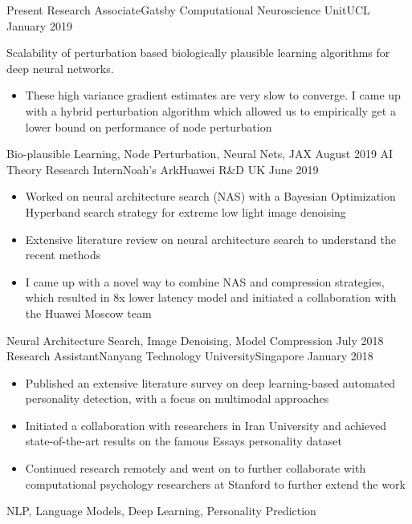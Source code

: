 %
%
%
\begin{experiences}
  \experience
    {Present}   {Research Associate}{Gatsby Computational Neuroscience Unit}{UCL}
    {January 2019} { Scalability of perturbation based biologically plausible learning algorithms for deep neural networks.  
                      \begin{itemize}
                        \item These high variance gradient estimates are very slow to converge. I came up with a hybrid perturbation algorithm which allowed us to empirically get a lower bound on performance of node perturbation
                      \end{itemize}
                    }
                    {Bio-plausible Learning, Node Perturbation, Neural Nets, JAX}
  \emptySeparator
  \experience
  {August 2019}   {AI Theory Research Intern}{Noah's Ark}{Huawei R\&D UK}
    {June 2019} {
                      \begin{itemize}
                        \item Worked on neural architecture search (NAS) with a Bayesian Optimization Hyperband search strategy for extreme low light image denoising                     
                        \item Extensive literature review on neural architecture search to understand the recent methods   
                        \item I came up with a novel way to combine NAS and compression strategies, which resulted in 8x lower latency model and initiated a collaboration with the Huawei Moscow team
                      \end{itemize}
                    }
                    {Neural Architecture Search, Image Denoising, Model Compression}
  \emptySeparator
  \experience
  {July 2018}   {Research Assistant}{Nanyang Technology University}{Singapore}
    {January 2018} {
                      \begin{itemize}
                        \item Published an extensive literature survey on deep learning-based automated personality detection, with a focus on multimodal approaches
                        \item Initiated a collaboration with researchers in Iran University and achieved state-of-the-art results on the famous Essays personality dataset
                        \item Continued research remotely and went on to further collaborate with computational psychology researchers at Stanford to further extend the work
                      \end{itemize}
                    }
                    {NLP, Language Models, Deep Learning, Personality Prediction}
\end{experiences}
